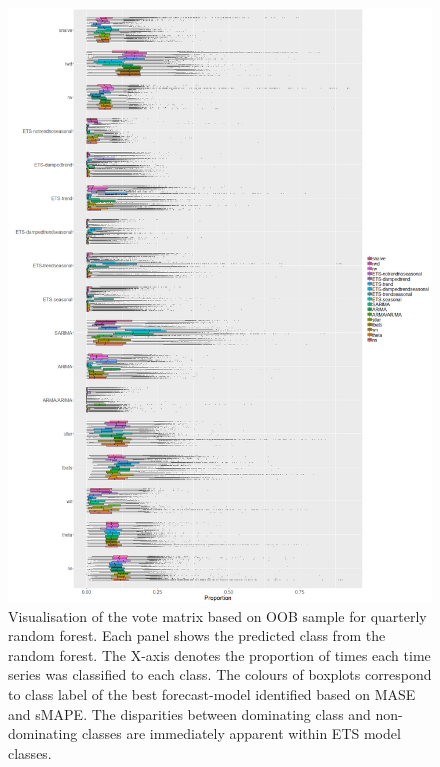\documentclass[11pt,a4paper,]{article}
\begin{document}
\begin{figure}
\centering
\includegraphics{figures/oobquarterly-1.png}
\caption{\label{fig:oobquarterly}Visualisation of the vote matrix based on OOB sample for quarterly random forest. Each panel shows the predicted class from the random forest. The X-axis denotes the proportion of times each time series was classified to each class. The colours of boxplots correspond to class label of the best forecast-model identified based on MASE and sMAPE. The disparities between dominating class and non-dominating classes are immediately apparent within ETS model classes.}
\end{figure}
\end{document}
